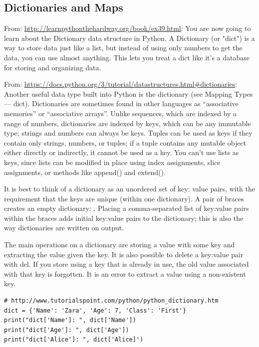 \documentclass[11pt,a4paper]{article}
\begin{document}
\subsection{Dictionaries and Maps}
From: \href{http://learnpythonthehardway.org/book/ex39.html}{http://learnpythonthehardway.org/book/ex39.html}: 
You are now going to learn about the Dictionary data structure in
Python. A Dictionary (or "dict") is a way to store data just like a
list, but instead of using only numbers to get the data, you can use
almost anything. This lets you treat a dict like it's a database for
storing and organizing data.

From: \href{https://docs.python.org/3/tutorial/datastructures.html\#dictionaries}{https://docs.python.org/3/tutorial/datastructures.html\#dictionaries}: 
Another useful data type built into Python is the dictionary (see
Mapping Types — dict). Dictionaries are sometimes found in other
languages as “associative memories” or “associative arrays”. Unlike
sequences, which are indexed by a range of numbers, dictionaries are
indexed by keys, which can be any immutable type; strings and numbers
can always be keys. Tuples can be used as keys if they contain only
strings, numbers, or tuples; if a tuple contains any mutable object
either directly or indirectly, it cannot be used as a key. You can’t
use lists as keys, since lists can be modified in place using index
assignments, slice assignments, or methods like append() and extend().

It is best to think of a dictionary as an unordered set of key: value
pairs, with the requirement that the keys are unique (within one
dictionary). A pair of braces creates an empty dictionary: {}. Placing
a comma-separated list of key:value pairs within the braces adds
initial key:value pairs to the dictionary; this is also the way
dictionaries are written on output.

The main operations on a dictionary are storing a value with some key
and extracting the value given the key. It is also possible to delete
a key:value pair with del. If you store using a key that is already in
use, the old value associated with that key is forgotten. It is an
error to extract a value using a non-existent key.

\begin{lstlisting}
# http://www.tutorialspoint.com/python/python_dictionary.htm
dict = {'Name': 'Zara', 'Age': 7, 'Class': 'First'}
print("dict['Name']: ", dict['Name'])
print("dict['Age']: ", dict['Age'])
print("dict['Alice']: ", dict['Alice]')
\end{lstlisting}
\end{document}
